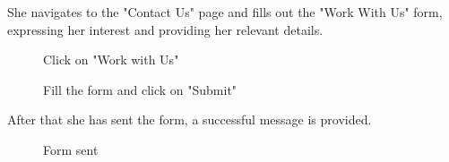\documentclass[11pt, letterpaper]{article}
\begin{document}
\noindent
She navigates to the "Contact Us" page and fills out the "Work With Us" form, expressing her interest and providing her relevant details.
\begin{figure}[H]
    \centering
    \setlength{\fboxsep}{0pt}
    \caption{Click on "Work with Us"}
    \label{fig:scenario2_7}
\end{figure}
\begin{figure}[H]
    \centering
    \setlength{\fboxsep}{0pt}
    \caption{Fill the form and click on "Submit"}
    \label{fig:scenario2_8}
\end{figure}
\noindent
After that she has sent the form, a successful message is provided.
\begin{figure}[H]
    \centering
    \setlength{\fboxsep}{0pt}
    \caption{Form sent}
    \label{fig:scenario2_9}
\end{figure}
\end{document}
